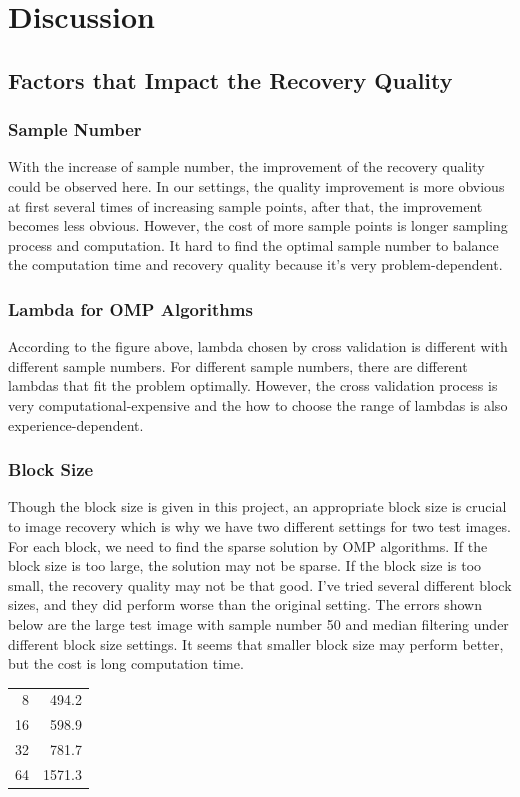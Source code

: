 \documentclass{article}
\begin{document}
\section{Discussion}
\subsection{Factors that Impact the Recovery Quality}
\subsubsection{Sample Number}
With the increase of sample number, the improvement of the recovery quality could be observed here. In our settings, the quality improvement is more obvious at first several times of increasing sample points, after that, the improvement becomes less obvious. However, the cost of more sample points is longer sampling process and computation. It hard to find the optimal sample number to balance the computation time and recovery quality because it's very problem-dependent.
\subsubsection{Lambda for OMP Algorithms}
According to the figure above, lambda chosen by cross validation is different with different sample numbers. For different sample numbers, there are different lambdas that fit the problem optimally. However, the cross validation process is very computational-expensive and the how to choose the range of lambdas is also experience-dependent. 
\subsubsection{Block Size}
Though the block size is given in this project, an appropriate block size is crucial to image recovery which is why we have two different settings for two test images. For each block, we need to find the sparse solution by OMP algorithms. If the block size is too large, the solution may not be sparse. If the block size is too small, the recovery quality may not be that good.
I've tried several different block sizes, and they did perform worse than the original setting. The errors shown below are the large test image with sample number 50 and median filtering under different block size settings. It seems that smaller block size may perform better, but the cost is long computation time.

\begin{tabular}{|r|r|}
	\hline
	\makecell{Block Size} & \makecell{Error}  \\ \hline
	
	8 & 494.2 \\
	16 & 598.9 \\ 
	32 & 781.7 \\ 
	64 &  1571.3\\ 
	\hline
	
\end{tabular}
\end{document}
